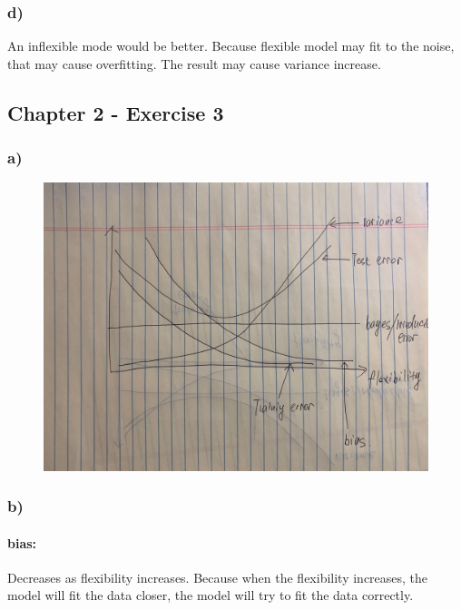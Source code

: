 \documentclass[]{article}
\let\oldparagraph\paragraph
\renewcommand{\paragraph}[1]{\oldparagraph{#1}\mbox{}}
\begin{document}
\subsubsection{d)}\label{d}

An inflexible mode would be better. Because flexible model may fit to
the noise, that may cause overfitting. The result may cause variance
increase.

\subsection{Chapter 2 - Exercise 3}\label{chapter-2---exercise-3}

\subsubsection{a)}\label{a-1}

\begin{figure}
\centering
\includegraphics{Chapter2_Exercise3a.png}
\caption{}
\end{figure}

\subsubsection{b)}\label{b-1}

\paragraph{bias:}\label{bias}

Decreases as flexibility increases. Because when the flexibility
increases, the model will fit the data closer, the model will try to fit
the data correctly.
\end{document}
